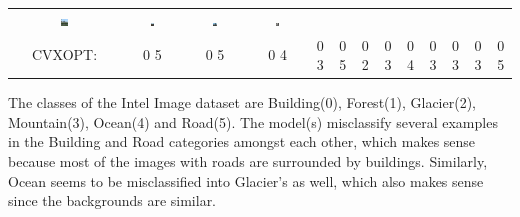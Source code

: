 \begin{enumerate}[label=(\alph*)]
\begin{center}
\begin{tabular}{c c c c c c c c c c c c c}
            \includegraphics[width=0.065\textwidth]{Images/Q2_multi/misclassified/cvxopt9_3_0.png} &
            \includegraphics[width=0.065\textwidth]{Images/Q2_multi/misclassified/cvxopt10_3_0.png} &
            \includegraphics[width=0.065\textwidth]{Images/Q2_multi/misclassified/cvxopt11_3_0.png} &
            \includegraphics[width=0.065\textwidth]{Images/Q2_multi/misclassified/cvxopt12_5_0.png} \\
            CVXOPT: &
            {\color{red} 0} {\color{green} 5} &
            {\color{red} 0} {\color{green} 5} &
            {\color{red} 0} {\color{green} 4} &
            {\color{red} 0} {\color{green} 3} &
            {\color{red} 0} {\color{green} 5} &
            {\color{red} 0} {\color{green} 2} &
            {\color{red} 0} {\color{green} 3} &
            {\color{red} 0} {\color{green} 4} &
            {\color{red} 0} {\color{green} 3} &
            {\color{red} 0} {\color{green} 3} &
            {\color{red} 0} {\color{green} 3} &
            {\color{red} 0} {\color{green} 5} \\
        \end{tabular}
    \end{center}

    The classes of the Intel Image dataset are Building(0), Forest(1), Glacier(2), Mountain(3), Ocean(4) and Road(5). The model(s) misclassify several examples in the Building and Road categories amongst each other, which makes sense because most of the images with roads are surrounded by buildings. Similarly, Ocean seems to be misclassified into Glacier's as well, which also makes sense since the backgrounds are similar.


\end{enumerate}
